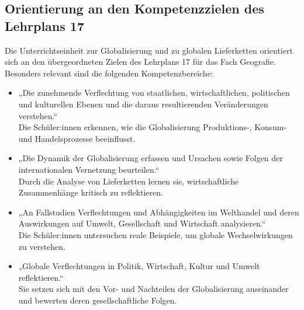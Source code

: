 \subsection{Orientierung an den Kompetenzzielen des Lehrplans 17}
Die Unterrichtseinheit zur Globalisierung und zu globalen Lieferketten orientiert sich an den übergeordneten Zielen des Lehrplans 17 für das Fach Geografie. Besonders relevant sind die folgenden Kompetenzbereiche:
\begin{itemize}
    \item „Die zunehmende Verflechtung von staatlichen, wirtschaftlichen, politischen und kulturellen Ebenen und die daraus resultierenden Veränderungen verstehen.“\\
    Die Schüler:innen erkennen, wie die Globalisierung Produktions-, Konsum- und Handelsprozesse beeinflusst.
    \item „Die Dynamik der Globalisierung erfassen und Ursachen sowie Folgen der internationalen Vernetzung beurteilen.“\\
    Durch die Analyse von Lieferketten lernen sie, wirtschaftliche Zusammenhänge kritisch zu reflektieren.
    \item „An Fallstudien Verflechtungen und Abhängigkeiten im Welthandel und deren Auswirkungen auf Umwelt, Gesellschaft und Wirtschaft analysieren.“\\
    Die Schüler:innen untersuchen reale Beispiele, um globale Wechselwirkungen zu verstehen.
    \item „Globale Verflechtungen in Politik, Wirtschaft, Kultur und Umwelt reflektieren.“\\
    Sie setzen sich mit den Vor- und Nachteilen der Globalisierung auseinander und bewerten deren gesellschaftliche Folgen.
\end{itemize}

